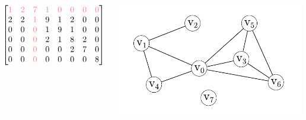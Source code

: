 \documentclass[xcolor=x11names,compress]{beamer}
\begin{document}
\begin{frame}
\begin{columns}
\begin{overprint}
\[\begin{bmatrix}
					\textcolor{red!50}{1} & \textcolor{red!50}{2} & \textcolor{red!50}{7} & \textcolor{red!50}{1} & \textcolor{red!50}{0} & \textcolor{red!50}{0} & \textcolor{red!50}{0} & \textcolor{red!50}{0} \\
					2                     & 2                     & \textcolor{red!50}{1} & 9                     & 1                     & 2                     & 0                     & 0                     \\
					0                     & 0                     & \textcolor{red!50}{0} & 1                     & 9                     & 1                     & 0                     & 0                     \\
					0                     & 0                     & \textcolor{red!50}{0} & 2                     & 1                     & 8                     & 2                     & 0                     \\
					0                     & 0                     & \textcolor{red!50}{0} & 0                     & 0                     & 2                     & 7                     & 0                     \\
					0                     & 0                     & \textcolor{red!50}{0} & 0                     & 0                     & 0                     & 0                     & 8
				\end{bmatrix}
			\]
		\end{overprint}
		\begin{center}
			\begin{overprint}
				\includegraphics[scale=0.6]{img/graph/chordalsimple.pdf}

\end{overprint}
\end{center}
\end{columns}
\end{frame}
\end{document}

